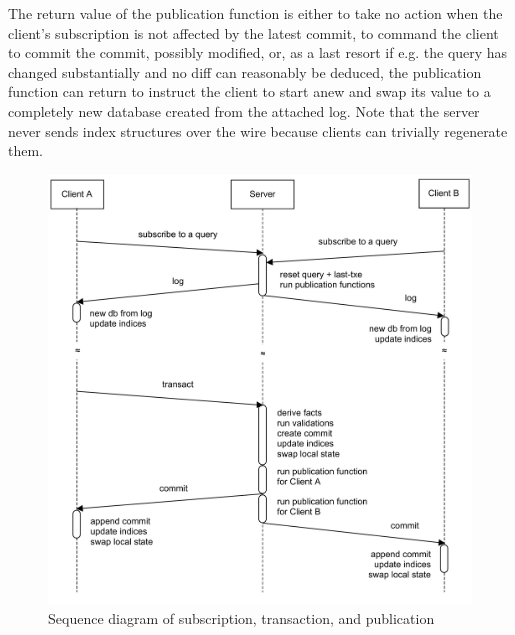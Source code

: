 \begin{center}
\end{center}

The return value of the publication function is either  to take no action when the client's subscription is not affected by the latest commit,  to command the client to commit the commit, possibly modified, or, as a last resort if e.g. the query has changed substantially and no diff can reasonably be deduced, the publication function can return  to instruct the client to start anew and swap its value to a completely new database created from the attached log. Note that the server never sends index structures over the wire because clients can trivially regenerate them.


\begin{figure}[!ht]
  \includegraphics[width=\linewidth]{images/pubsub.pdf}
  \caption{Sequence diagram of subscription, transaction, and publication}
  \label{fig:pubsub}
\end{figure}



